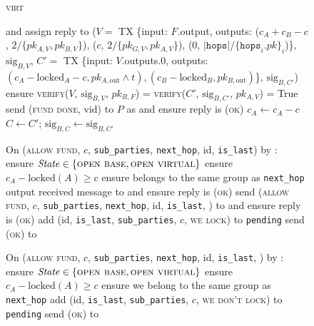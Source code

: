 \begin{figure}[H]
\begin{processbox}{\textsc{virt}}
\begin{algorithmic}[1]
          and assign reply to ($V =$ TX \{input: $F$.output, outputs: ($c_A +
          c_B - c$, $2/\{pk_{A, V}, pk_{B, V}\}$), ($c$, $2/\{pk_{G, V}, pk_{A,
          V}\}$), (0, $|\mathtt{hops}|$/$\{\mathtt{hops}_i.pk\}_i$)\},
          $\mathrm{sig}_{B, V}$, $C' =$ TX \{input: $V$.outputs.0, outputs:
          $(c_A - \mathrm{locked}_A - c, pk_{A, \mathrm{out}} \wedge t), (c_B -
          \mathrm{locked}_B, pk_{B, \mathrm{out}})$\}, $\mathrm{sig}_{B, C'}$)
          \State ensure \textsc{verify}($V$, $\mathrm{sig}_{B, V}$, $pk_{B,
          F}$) = \textsc{verify}($C'$, $\mathrm{sig}_{B, C'}$, $pk_{A, V}$) =
          True
        \EndIf
        \label{code:functionality:chan:skeleton:virtual:fund:simulate}
         
        \label{code:functionality:chan:skeleton:virtual:fund:confirm}
          \State send (\textsc{fund done}, vid) to $P$ as \alice and ensure reply
          is (\textsc{ok})
        \EndFor
        \State $c_A \gets c_A - c$
          \State $C \gets C'$; $\mathrm{sig}_{B, C} \gets \mathrm{sig}_{B, C'}$
        \EndIf

      \State {}
      \State On (\textsc{allow fund}, $c$, \texttt{sub\_parties},
      \texttt{next\_hop}, id, \texttt{is\_last}) by \charlie:
      \Indent
        \State ensure $\mathit{State} \in \{\textsc{open base}, \textsc{open
        virtual}\}$
        \State ensure $c_A - \mathrm{locked}(A) \geq c$
        \State ensure \bob belongs to the same group as \texttt{next\_hop}
        \State output received message to \dave and ensure reply is
        \textsc{(ok)}
        \State send (\textsc{allow fund}, $c$, \texttt{sub\_parties},
        \texttt{next\_hop}, id, \texttt{is\_last}, \charlie) to \bob and ensure
        reply is (\textsc{ok})
        \State add (id, \texttt{is\_last}, \texttt{sub\_parties}, $c$,
        \textsc{we lock}) to \texttt{pending}
        \State send (\textsc{ok}) to \charlie
      \EndIndent
      \Statex

      \State {}
      \State On (\textsc{allow fund}, $c$, \texttt{sub\_parties},
      \texttt{next\_hop}, id, \texttt{is\_last}, \charlie) by \bob:
      \Indent
        \State ensure $\mathit{State} \in \{\textsc{open base}, \textsc{open
        virtual}\}$
        \State ensure $c_A - \mathrm{locked}(A) \geq c$
        \State ensure we belong to the same group as \texttt{next\_hop}
        \State add (id, \texttt{is\_last}, \texttt{sub\_parties}, $c$,
        \textsc{we don't lock}) to \texttt{pending}
        \State send (\textsc{ok}) to \bob
      \EndIndent
      \Statex


\end{algorithmic}
\end{processbox}
\end{figure}
